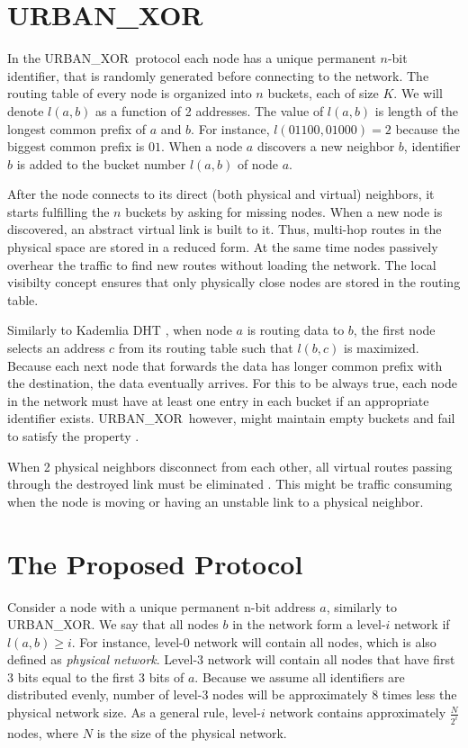 \documentclass[14pt]{extarticle}
\theoremstyle{definition}
\newcommand{\urbanxor}{URBAN\_XOR}
\begin{document}
\section{\urbanxor}

In the \urbanxor\ protocol each node has a unique permanent $n$-bit identifier, that is randomly generated before connecting to the network. The routing table of every node is organized into $n$ buckets, each of size $K$. We will denote $l(a,b)$ as a function of 2 addresses. The value of $l(a,b)$ is length of the longest common prefix of $a$ and $b$. For instance, $l(01100, 01000) = 2$ because the biggest common prefix is $01$. When a node $a$ discovers a new neighbor $b$, identifier $b$ is added to the bucket number $l(a,b)$ of node $a$.

After the node connects to its direct (both physical and virtual) neighbors, it starts fulfilling the $n$ buckets by asking for missing nodes. When a new node is discovered, an abstract virtual link is built to it. Thus, multi-hop routes in the physical space are stored in a reduced form. At the same time nodes passively overhear the traffic to find new routes without loading the network. The local visibilty concept ensures that only physically close nodes are stored in the routing table.

Similarly to Kademlia DHT \cite{kademlia}, when node $a$ is routing data to $b$, the first node selects an address $c$ from its routing table such that $l(b,c)$ is maximized. Because each next node that forwards the data has longer common prefix with the destination, the data eventually arrives. For this to be always true, each node in the network must have at least one entry in each bucket if an appropriate identifier exists. \urbanxor\, however, might maintain empty buckets and fail to satisfy the property \cite{Pasquini}.

When 2 physical neighbors disconnect from each other, all virtual routes passing through the destroyed link must be eliminated \cite{Pasquini}. This might be traffic consuming when the node is moving or having an unstable link to a physical neighbor.


\section{The Proposed Protocol}

Consider a node with a unique permanent n-bit address $a$, similarly to \urbanxor. We say that all nodes $b$ in the network form a level-$i$ network if $l(a,b) \ge i$. For instance, level-0 network will contain all nodes, which is also defined as \emph{physical network}. Level-3 network will contain all nodes that have first 3 bits equal to the first 3 bits of $a$. Because we assume all identifiers are distributed evenly, number of level-3 nodes will be approximately 8 times less the physical network size. As a general rule, level-$i$ network contains approximately $\frac{N}{2^i}$ nodes, where $N$ is the size of the physical network.
\end{document}

